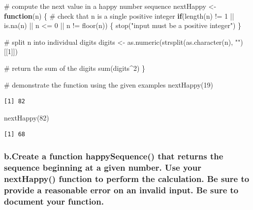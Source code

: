 \documentclass[
  letterpaper,
  DIV=11,
  numbers=noendperiod]{scrartcl}
\newenvironment{Shaded}{\begin{snugshade}}{\end{snugshade}}
\newcommand{\CommentTok}[1]{\textcolor[rgb]{0.37,0.37,0.37}{#1}}
\newcommand{\ControlFlowTok}[1]{\textcolor[rgb]{0.00,0.23,0.31}{\textbf{#1}}}
\newcommand{\DecValTok}[1]{\textcolor[rgb]{0.68,0.00,0.00}{#1}}
\newcommand{\FunctionTok}[1]{\textcolor[rgb]{0.28,0.35,0.67}{#1}}
\newcommand{\NormalTok}[1]{\textcolor[rgb]{0.00,0.23,0.31}{#1}}
\newcommand{\OtherTok}[1]{\textcolor[rgb]{0.00,0.23,0.31}{#1}}
\newcommand{\SpecialCharTok}[1]{\textcolor[rgb]{0.37,0.37,0.37}{#1}}
\newcommand{\StringTok}[1]{\textcolor[rgb]{0.13,0.47,0.30}{#1}}
\begin{document}
\begin{Shaded}
\begin{Highlighting}[]
\CommentTok{\# compute the next value in a happy number sequence}
\NormalTok{nextHappy }\OtherTok{\textless{}{-}} \ControlFlowTok{function}\NormalTok{(n) \{}
  \CommentTok{\# check that n is a single positive integer}
  \ControlFlowTok{if}\NormalTok{(}\FunctionTok{length}\NormalTok{(n) }\SpecialCharTok{!=} \DecValTok{1} \SpecialCharTok{||} \FunctionTok{is.na}\NormalTok{(n) }\SpecialCharTok{||}\NormalTok{ n }\SpecialCharTok{\textless{}=} \DecValTok{0} \SpecialCharTok{||}\NormalTok{ n }\SpecialCharTok{!=} \FunctionTok{floor}\NormalTok{(n)) \{}
    \FunctionTok{stop}\NormalTok{(}\StringTok{"input must be a positive integer"}\NormalTok{)}
\NormalTok{  \}}
  
  \CommentTok{\# split n into individual digits}
\NormalTok{  digits }\OtherTok{\textless{}{-}} \FunctionTok{as.numeric}\NormalTok{(}\FunctionTok{strsplit}\NormalTok{(}\FunctionTok{as.character}\NormalTok{(n), }\StringTok{""}\NormalTok{)[[}\DecValTok{1}\NormalTok{]])}
  
  \CommentTok{\# return the sum of the digits}
  \FunctionTok{sum}\NormalTok{(digits}\SpecialCharTok{\^{}}\DecValTok{2}\NormalTok{)}
\NormalTok{\}}

\CommentTok{\# demonstrate the function using the given examples}
\FunctionTok{nextHappy}\NormalTok{(}\DecValTok{19}\NormalTok{)}
\end{Highlighting}
\end{Shaded}

\begin{verbatim}
[1] 82
\end{verbatim}

\begin{Shaded}
\begin{Highlighting}[]
\FunctionTok{nextHappy}\NormalTok{(}\DecValTok{82}\NormalTok{)}
\end{Highlighting}
\end{Shaded}

\begin{verbatim}
[1] 68
\end{verbatim}

\subsubsection{b.Create a function happySequence() that returns the
sequence beginning at a given number. Use your nextHappy() function to
perform the calculation. Be sure to provide a reasonable error on an
invalid input. Be sure to document your
function.}\label{b.create-a-function-happysequence-that-returns-the-sequence-beginning-at-a-given-number.-use-your-nexthappy-function-to-perform-the-calculation.-be-sure-to-provide-a-reasonable-error-on-an-invalid-input.-be-sure-to-document-your-function.}
\end{document}
